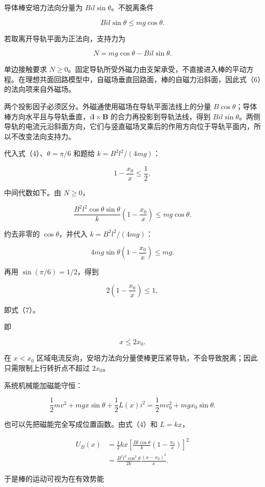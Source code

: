 \documentclass[12pt,a4paper,UTF8]{ctexart}
\begin{document}
导体棒安培力法向分量为 \(Bil\sin\theta\)。不脱离条件

\[
Bil\sin\theta\le mg\cos\theta.
\tag{5}
\]

若取离开导轨平面为正法向，支持力为

\[
N=mg\cos\theta-Bil\sin\theta.
\tag{6}
\]

单边接触要求
\(N\ge0\)。固定导轨所受外磁力由支架承受，不直接进入棒的平动方程。在理想共面回路模型中，自磁场垂直回路面，棒的自磁力沿斜面，因此式（6）的法向项来自外磁场。

两个投影因子必须区分。外磁通使用磁场在导轨平面法线上的分量
\(B\cos\theta\)；导体棒方向水平且与导轨垂直，\(i\boldsymbol l\times\boldsymbol B\)
的合力再投影到导轨法线，得到
\(Bil\sin\theta\)。两侧导轨的电流元沿斜面方向，它们与竖直磁场叉乘后的作用方向位于导轨平面内，所以不改变法向支持力。

代入式（4）、\(\theta=\pi/6\) 和题给 \(k=B^2l^2/(4mg)\)：

\[
1-\frac{x_0}{x}\le\frac12,
\tag{7}
\]

中间代数如下。由 \(N\ge0\)，

\[
\frac{B^2l^2\cos\theta\sin\theta}{k}
\left(1-\frac{x_0}{x}\right)
\le mg\cos\theta.
\]

约去非零的 \(\cos\theta\)，并代入 \(k=B^2l^2/(4mg)\)：

\[
4mg\sin\theta
\left(1-\frac{x_0}{x}\right)
\le mg.
\]

再用 \(\sin(\pi/6)=1/2\)，得到

\[
2\left(1-\frac{x_0}{x}\right)\le1,
\]

即式（7）。

即

\[
x\le2x_0.
\tag{8}
\]

在 \(x<x_0\)
区域电流反向，安培力法向分量使棒更压紧导轨，不会导致脱离；因此只需限制上行转折点不超过
\(2x_0\)。

系统机械能加磁能守恒：

\[
\frac12mv^2+mgx\sin\theta+\frac12L(x)i^2
=\frac12mv_0^2+mgx_0\sin\theta.
\tag{9}
\]

也可以先把磁能完全写成位置函数。由式（4）和 \(L=kx\)，

\[
\begin{aligned}
U_B(x)
&=\frac12kx
\left[\frac{Bl\cos\theta}{k}
\left(1-\frac{x_0}{x}\right)\right]^2\\
&=\frac{B^2l^2\cos^2\theta}{2k}
\frac{(x-x_0)^2}{x}.
\end{aligned}
\tag{10}
\]

于是棒的运动可视为在有效势能
\end{document}
